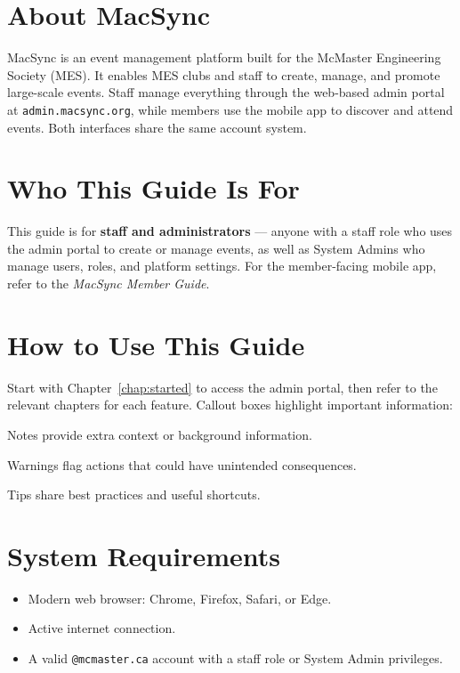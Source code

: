 \documentclass[12pt, twoside]{report}
\begin{document}
\section{About MacSync}

MacSync is an event management platform built for the McMaster Engineering Society (MES).
It enables MES clubs and staff to create, manage, and promote large-scale events.
Staff manage everything through the web-based admin portal at
\texttt{admin.macsync.org}, while members use the mobile app to discover and
attend events. Both interfaces share the same account system.

\section{Who This Guide Is For}

This guide is for \textbf{staff and administrators} --- anyone with a staff role
who uses the admin portal to create or manage events, as well as System Admins
who manage users, roles, and platform settings. For the member-facing mobile
app, refer to the \textit{MacSync Member Guide}.

\section{How to Use This Guide}

Start with Chapter~\ref{chap:started} to access the admin portal, then refer
to the relevant chapters for each feature. Callout boxes highlight important
information:

\begin{notebox}
Notes provide extra context or background information.
\end{notebox}

\begin{warnbox}
Warnings flag actions that could have unintended consequences.
\end{warnbox}

\begin{tipbox}
Tips share best practices and useful shortcuts.
\end{tipbox}

\section{System Requirements}
\begin{itemize}
  \item Modern web browser: Chrome, Firefox, Safari, or Edge.
  \item Active internet connection.
  \item A valid \texttt{@mcmaster.ca} account with a staff role or
        System Admin privileges.
\end{itemize}
\end{document}
